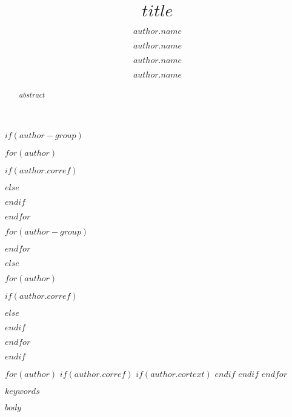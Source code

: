 \documentclass[$els-options$]{elsarticle}
\begin{document}
\begin{frontmatter}

\title{$title$}

$if(author-group)$

$for(author)$

$if(author.corref)$
\author[$author.group$]{$author.name$}
$else$
\author[$author.group$]{$author.name$}
$endif$



$endfor$

$for(author-group)$
\address[$author-group.name$]{$author-group.address$}
$endfor$

$else$

$for(author)$

$if(author.corref)$
\author{$author.name$}
$else$
\author{$author.name$}
$endif$


\address{$author.address$}

$endfor$

$endif$

$for(author)$
$if(author.corref)$
$if(author.cortext)$
$endif$
$endif$
$endfor$


\begin{abstract}
$abstract$
\end{abstract}

\begin{keyword}
$keywords$
\end{keyword}

\end{frontmatter}


$body$



\end{document}
